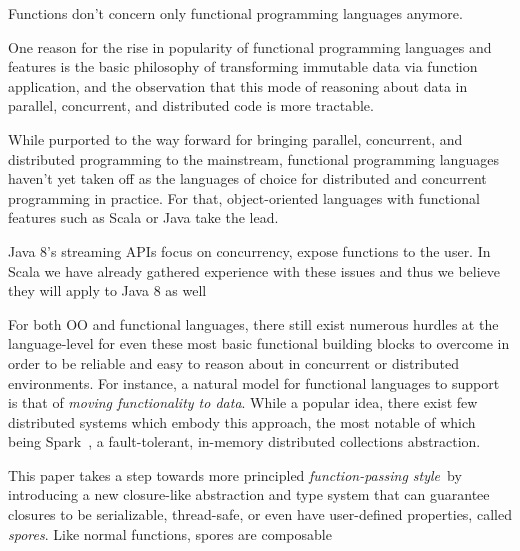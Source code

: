 \documentclass{llncs}
\begin{document}

Functions don't concern only functional programming languages anymore.

One reason for the rise in
popularity of functional programming languages and features is the basic
philosophy of transforming immutable data via function application, and the
observation that this mode of reasoning about data in parallel, concurrent,
and distributed code is more tractable.


While purported to the way forward for bringing parallel, concurrent, and
distributed programming to the mainstream, functional programming languages
haven't yet taken off as the languages of choice for distributed and
concurrent programming in practice. For that, object-oriented languages with functional features such as Scala or Java take the lead. 

Java 8's streaming APIs focus on concurrency, expose functions to the user.
In Scala we have already gathered experience with these issues and thus we
believe they will apply to Java 8 as well

For both OO and functional languages, there still exist numerous hurdles at
the language-level for even these most basic functional building blocks to
overcome in order to be reliable and easy to reason about in concurrent or
distributed environments. For instance, a natural model for
functional languages to support is that of {\em moving functionality to
data}. While a popular idea, there exist few distributed systems which embody
this approach, the most notable of which being Spark~\cite{Spark}, a fault-tolerant, 
in-memory distributed collections abstraction.


This paper takes a step towards more principled {\em function-passing
style}~by
introducing a new closure-like abstraction and type system that can guarantee
closures to be serializable, thread-safe, or even have user-defined
properties, called {\em spores}. Like normal functions, spores are composable
\end{document}
